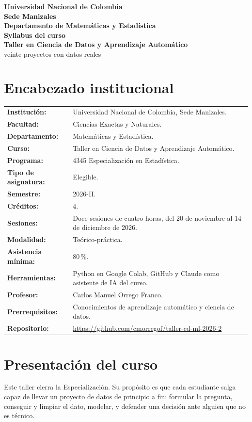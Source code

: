 \documentclass[12pt,letterpaper]{article}
\begin{document}
\begin{center}
    {\Large \textbf{Universidad Nacional de Colombia}}\\
    {\large \textbf{Sede Manizales}}\\
    {\large \textbf{Departamento de Matemáticas y Estadística}}\\[1em]
    {\LARGE \textbf{Syllabus del curso}}\\[0.4em]
    {\LARGE \textbf{Taller en Ciencia de Datos y Aprendizaje Automático}}\\[0.4em]
    {\large veinte proyectos con datos reales}\\[1em]
\end{center}

\section{Encabezado institucional}
\begin{tabularx}{\textwidth}{>{\bfseries}p{4.5cm}X}
Institución: & Universidad Nacional de Colombia, Sede Manizales.\\
Facultad: & Ciencias Exactas y Naturales.\\
Departamento: & Matemáticas y Estadística.\\
Curso: & Taller en Ciencia de Datos y Aprendizaje Automático.\\
Programa: & 4345 Especialización en Estadística.\\
Tipo de asignatura: & Elegible.\\
Semestre: & 2026-II.\\
Créditos: & 4.\\
Sesiones: & Doce sesiones de cuatro horas, del 20 de noviembre al 14 de diciembre de 2026.\\
Modalidad: & Teórico-práctica.\\
Asistencia mínima: & 80\,\%.\\
Herramientas: & Python en Google Colab, GitHub y Claude como asistente de IA del curso.\\
Profesor: & Carlos Manuel Orrego Franco.\\
Prerrequisitos: & Conocimientos de aprendizaje automático y ciencia de datos.\\
Repositorio: & \url{https://github.com/cmorregof/taller-cd-ml-2026-2}\\
\end{tabularx}

\section{Presentación del curso}
Este taller cierra la Especialización. Su propósito es que cada estudiante salga capaz de llevar un proyecto de datos de principio a fin: formular la pregunta, conseguir y limpiar el dato, modelar, y defender una decisión ante alguien que no es técnico.
\end{document}
